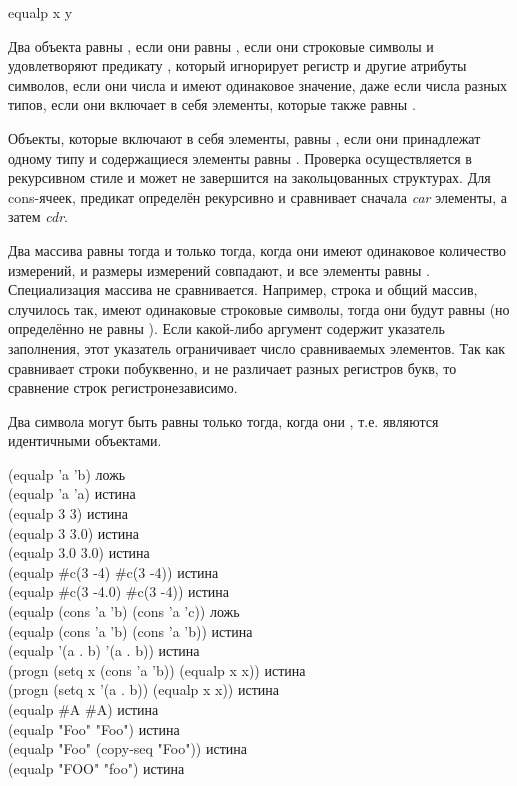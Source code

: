 \begin{defun}[Функция]
\begin{defun}[Функция]
equalp x y

Два объекта равны , если они равны ,
если они строковые символы и удовлетворяют предикату , который
игнорирует регистр и другие атрибуты символов,
если они числа и имеют одинаковое значение, даже если числа разных типов,
если они включает в себя элементы, которые также равны .

Объекты, которые включают в себя элементы, равны , если они
принадлежат одному типу и содержащиеся элементы равны .
Проверка осуществляется в рекурсивном стиле и может не завершится на
закольцованных структурах.
Для cons-ячеек, предикат  определён рекурсивно и сравнивает сначала
\emph{car} элементы, а затем \emph{cdr}.

Два массива равны  тогда и только тогда, когда они имеют одинаковое
количество измерений, и размеры измерений совпадают, и все элементы равны
. Специализация массива не сравнивается. Например,
строка и общий массив, случилось так, имеют одинаковые строковые символы,
тогда они будут равны  (но определённо не равны ).
Если какой-либо аргумент содержит указатель заполнения, этот указатель
ограничивает число сравниваемых элементов. Так как  сравнивает
строки побуквенно, и не различает разных регистров букв, то сравнение строк
регистронезависимо.

Два символа могут быть равны  только тогда, когда они ,
т.е. являются идентичными объектами.

\begin{lisp}
(equalp 'a 'b) \textrm{ложь} \\
(equalp 'a 'a) \textrm{истина} \\
(equalp 3 3) \textrm{истина} \\
(equalp 3 3.0) \textrm{истина} \\
(equalp 3.0 3.0) \textrm{истина} \\
(equalp \#c(3 -4) \#c(3 -4)) \textrm{истина} \\
(equalp \#c(3 -4.0) \#c(3 -4)) \textrm{истина} \\
(equalp (cons 'a 'b) (cons 'a 'c)) \textrm{ложь} \\
(equalp (cons 'a 'b) (cons 'a 'b)) \textrm{истина} \\
(equalp '(a . b) '(a . b)) \textrm{истина} \\
(progn (setq x (cons 'a 'b)) (equalp x x)) \textrm{истина} \\
(progn (setq x '(a . b)) (equalp x x)) \textrm{истина} \\
(equalp \#{\Xbackslash}A \#{\Xbackslash}A) \textrm{истина} \\
(equalp "Foo" "Foo") \textrm{истина} \\
(equalp "Foo" (copy-seq "Foo")) \textrm{истина} \\
(equalp "FOO" "foo") \textrm{истина}
\end{lisp}
\end{defun}


\end{defun}
